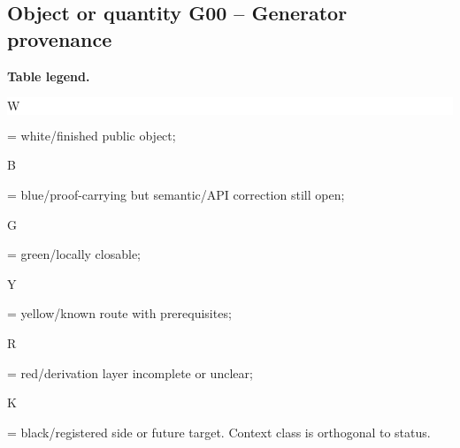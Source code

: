 \subsection*{Object or quantity G00 -- Generator provenance}
\hypertarget{objproof:G00}{}
\par\smallskip\noindent\begin{minipage}{0.99\linewidth}\footnotesize\raggedright\textbf{Table legend.} \colorbox{white}{\strut W} = white/finished public object; \colorbox{cyan!20}{\strut B} = blue/proof-carrying but semantic/API correction still open; \colorbox{green!18}{\strut G} = green/locally closable; \colorbox{yellow!25}{\strut Y} = yellow/known route with prerequisites; \colorbox{red!20}{\strut R} = red/derivation layer incomplete or unclear; \colorbox{black!18}{\strut K} = black/registered side or future target. Context class is orthogonal to status.\end{minipage}\par\vspace{0.25em}
